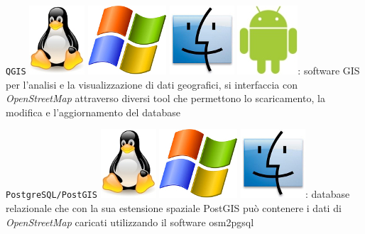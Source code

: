\documentclass[a4paper,twoside,12pt,]{article}
\newcommand{\osm}{\emph{OpenStreetMap}\xspace}
\newcommand{\soft}[1]{\texttt{#1}}
\begin{document}
\soft{QGIS} \includegraphics{./linux-logo.jpg} \includegraphics{./windows-logo.jpg} \includegraphics{./mac-logo.jpg} \includegraphics{./android-logo.jpg}: software GIS per l'analisi e la visualizzazione di dati geografici, si interfaccia con \osm attraverso diversi tool che permettono lo scaricamento, la modifica e l'aggiornamento del database

\soft{PostgreSQL/PostGIS} \includegraphics{./linux-logo.jpg} \includegraphics{./windows-logo.jpg} \includegraphics{./mac-logo.jpg}: database relazionale che con la sua estensione spaziale PostGIS può contenere i dati di \osm caricati utilizzando il software osm2pgsql
\end{document}
